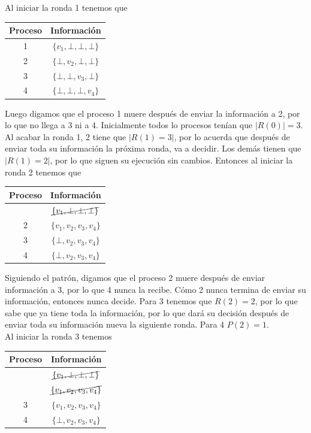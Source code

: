 \documentclass[12pt,a4paper]{report}
\begin{document}
\begin{enumerate}
{\begin{enumerate} [label = \alph*)]
{				Al iniciar la ronda 1 tenemos que
				\begin{center}
					\begin{tabular}{|c|c|}
						\hline
						Proceso & Información\\
						\hline
						1 & $\{v_1, \bot, \bot, \bot\}$\\
						\hline
						2 & $\{\bot, v_2, \bot, \bot\}$\\
						\hline
						3 & $\{\bot, \bot, v_3, \bot\}$\\
						\hline
						4 & $\{\bot, \bot, \bot, v_4\}$\\
						\hline
					\end{tabular}
				\end{center}
				Luego digamos que el proceso 1 muere después de enviar la información a
				2, por lo que no llega a 3 ni a 4.  Inicialmente todos lo procesos
				tenían que $|R(0)| = 3$. Al acabar la ronda 1, 2 tiene que $|R(1) = 3|$, por
				lo acuerda que después de enviar toda su información la próxima ronda,
				va a decidir.
				Los demás tienen que $|R(1) = 2|$, por lo que siguen su ejecución sin cambios.
				Entonces al iniciar la ronda 2 tenemos
				que
				\begin{center}
					\begin{tabular}{|c|c|}
						\hline
						Proceso & Información\\
						\hline
						\cancel{1} & $\cancel{\{v_1, \bot, \bot, \bot\}}$\\
						\hline
						2 & $\{v_1, v_2, v_3, v_4\}$\\
						\hline
						3 & $\{\bot, v_2, v_3, v_4\}$\\
						\hline
						4 & $\{\bot, v_2, v_3, v_4\}$\\
						\hline
					\end{tabular}
				\end{center}
				Siguiendo el patrón, digamos que el proceso 2 muere después de enviar
				información a 3, por lo que 4 nunca la recibe. Cómo 2 nunca termina de
				enviar su información, entonces nunca decide. Para 3 tenemos que
				$R(2) = 2$, por lo que sabe que ya tiene toda la información, por lo que
				dará su decisión después de enviar toda su información nueva la siguiente
				ronda. Para 4 $P(2)=1$.\\

				Al iniciar la ronda 3 tenemos
				\begin{center}
					\begin{tabular}{|c|c|}
						\hline
						Proceso & Información\\
						\hline
						\cancel{1} & $\cancel{\{v_1, \bot, \bot, \bot\}}$\\
						\hline
						\cancel{2}& $\cancel{\{v_1, v_2, v_3, v_4\}}$\\
						\hline
						3 & $\{v_1, v_2, v_3, v_4\}$\\
						\hline
						4 & $\{\bot, v_2, v_3, v_4\}$\\
						\hline
					\end{tabular}
				\end{center}

}
\end{enumerate}}
\end{enumerate}
\end{document}
